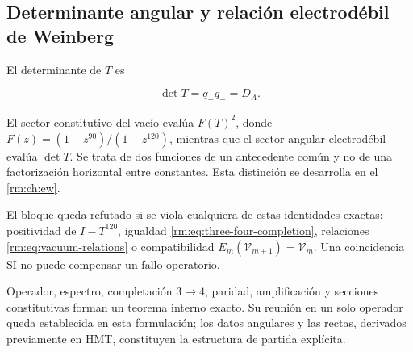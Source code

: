 \subsection{Determinante angular y relaci\'on electrod\'ebil de Weinberg}

El determinante de \(T\) es

\begin{equation}
\det T=q_+q_-=D_A.
\label{rm:eq:detT}
\end{equation}

El sector constitutivo del vac\'io eval\'ua \(F(T)^2\), donde
\(F(z)=(1-z^{90})/(1-z^{120})\), mientras que el sector angular
electrod\'ebil eval\'ua \(\det T\). Se trata de dos funciones de un
antecedente com\'un y no de una factorizaci\'on horizontal entre constantes.
Esta distinci\'on se desarrolla en el \cref{rm:ch:ew}.

\begin{falsifier}
El bloque queda refutado si se viola cualquiera de estas identidades exactas:
positividad de \(I-T^{120}\), igualdad
\cref{rm:eq:three-four-completion}, relaciones \cref{rm:eq:vacuum-relations} o
compatibilidad \(E_m(\mathcal V_{m+1})=\mathcal V_m\). Una coincidencia SI
no puede compensar un fallo operatorio.
\end{falsifier}

\begin{statusbox}
Operador, espectro, completaci\'on \(3\to4\), paridad, amplificaci\'on y
secciones constitutivas forman un teorema interno exacto. Su reuni\'on en un
solo operador queda establecida en esta formulaci\'on; los datos angulares y
las rectas, derivados previamente en HMT, constituyen la estructura de partida
expl\'icita.
\end{statusbox}
